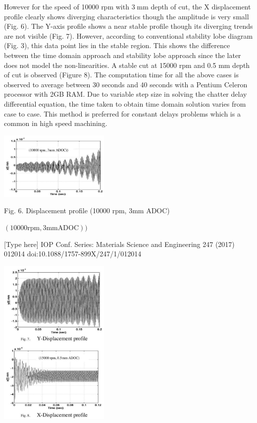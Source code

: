\documentclass[10pt]{article}
\begin{document}
However for the speed of 10000 rpm with \(3\mathrm{\;{mm}}\) depth of cut, the \(\mathrm{X}\) displacement profile clearly shows diverging characteristics though the amplitude is very small (Fig. 6). The Y-axis profile shows a near stable profile though its diverging trends are not visible (Fig. 7). However, according to conventional stability lobe diagram (Fig. 3), this data point lies in the stable region. This shows the difference between the time domain approach and stability lobe approach since the later does not model the non-linearities. A stable cut at 15000 rpm and 0.5 mm depth of cut is observed (Figure 8). The computation time for all the above cases is observed to average between 30 seconds and 40 seconds with a Pentium Celeron processor with 2GB RAM. Due to variable step size in solving the chatter delay differential equation, the time taken to obtain time domain solution varies from case to case. This method is preferred for constant delays problems which is a common in high speed machining.

\begin{center}
\includegraphics[max width=0.4\textwidth]{images/01948e67-2b92-7dd1-b16f-a9746c8d80be_8_535_1593_557_343_0.jpg}
\end{center}
\hspace*{3em} 

Fig. 6. Displacement profile (10000 rpm, 3mm ADOC)

\(\left( {{10000}\mathrm{{rpm}},3\mathrm{{mm}}\mathrm{{ADOC}}}\right) )\)

[Type here] IOP Conf. Series: Materials Science and Engineering 247 (2017) 012014 doi:10.1088/1757-899X/247/1/012014

\begin{center}
\includegraphics[max width=0.4\textwidth]{images/01948e67-2b92-7dd1-b16f-a9746c8d80be_9_546_263_560_858_0.jpg}
\end{center}
\hspace*{3em} 
\end{document}
